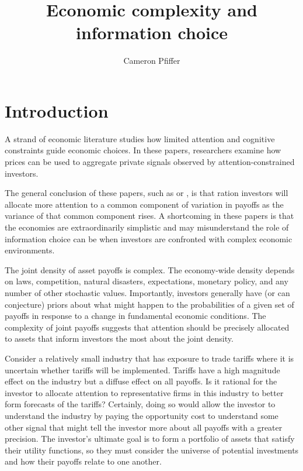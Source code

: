 \documentclass{article}
\title{Economic complexity and information choice}
\author{Cameron Pfiffer}
\begin{document}
\newcommand{\Gauss}{\mathcal{N}}
\newcommand{\Var}{\text{Var}}
\newcommand{\E}{\text{E}}
\newcommand{\argmax}{\text{argmax}}

\newtheorem{definition}{Definition}


\newpage

\maketitle

\section{Introduction}

A strand of economic literature studies how limited attention and cognitive constraints guide economic choices. In these papers, researchers examine how prices can be used to aggregate private signals observed by attention-constrained investors. 

The general conclusion of these papers, such as \textcite{kacperczyk_rational_2016} or \textcite{peng_investor_2006}, is that ration investors will allocate more attention to a common component of variation in payoffs as the variance of that common component rises. A shortcoming in these papers is that the economies are extraordinarily simplistic and may misunderstand the role of information choice can be when investors are confronted with complex economic environments.

The joint density of asset payoffs is complex. The economy-wide density depends on laws, competition, natural disasters, expectations, monetary policy, and any number of other stochastic values. Importantly, investors generally have (or can conjecture) priors about what might happen to the probabilities of a given set of payoffs in response to a change in fundamental economic conditions. The complexity of joint payoffs suggests that attention should be precisely allocated to assets that inform investors the most about the joint density.

Consider a relatively small industry that has exposure to trade tariffs where it is uncertain whether tariffs will be implemented. Tariffs have a high magnitude effect on the industry but a diffuse effect on all payoffs. Is it rational for the investor to allocate attention to representative firms in this industry to better form forecasts of the tariffs? Certainly, doing so would allow the investor to understand the industry by paying the opportunity cost to understand some other signal that might tell the investor more about all payoffs with a greater precision. The investor's ultimate goal is to form a portfolio of assets that satisfy their utility functions, so they must consider the universe of potential investments and how their payoffs relate to one another.
\end{document}
